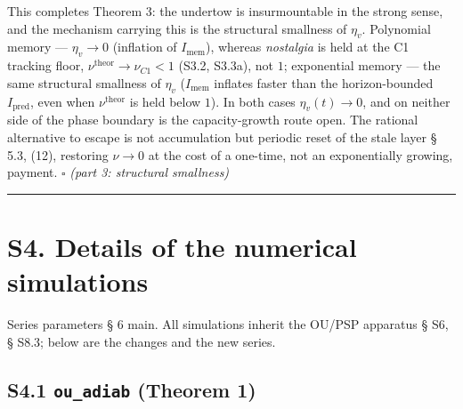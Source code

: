 \documentclass[12pt]{iopart}
\providecommand{\texorpdfstring}[2]{#1}
\begin{document}
This completes Theorem 3: the undertow is insurmountable in the strong sense, and the mechanism carrying this is the structural smallness of \(\eta_v\). Polynomial memory --- \(\eta_v \to 0\) (inflation of \(I_{\text{mem}}\)), whereas \emph{nostalgia} is held at the C1 tracking floor, \(\nu^{\text{theor}} \to \nu_{C1} < 1\) (S3.2, S3.3a), not \(1\); exponential memory --- the same structural smallness of \(\eta_v\) (\(I_{\text{mem}}\) inflates faster than the horizon-bounded \(I_{\text{pred}}\), even when \(\nu^{\text{theor}}\) is held below \(1\)). In both cases \(\eta_v(t) \to 0\), and on neither side of the phase boundary is the capacity-growth route open. The rational alternative to escape is not accumulation but periodic reset of the stale layer \cite{Andriishin2026b} § 5.3, (12), restoring \(\nu \to 0\) at the cost of a one-time, not an exponentially growing, payment. \(\square\) \emph{(part 3: structural smallness)}



\begin{center}\rule{0.5\linewidth}{0.5pt}\end{center}



\section{S4. Details of the numerical simulations}\label{s4.-details-of-the-numerical-simulations}



Series parameters § 6 main. All simulations inherit the OU/PSP apparatus \cite{Andriishin2026b} § S6, § S8.3; below are the changes and the new series.



\subsection{\texorpdfstring{S4.1 \texttt{ou\_adiab} (Theorem 1)}{S4.1 ou\_adiab (Theorem 1)}}\label{s4.1-ou_adiab-theorem-1}
\end{document}
